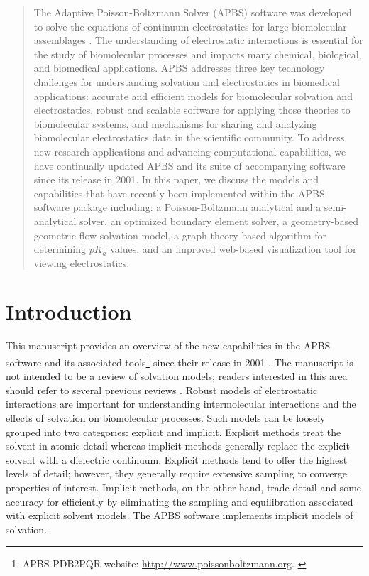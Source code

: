 \documentclass[11pt,titlepage]{article}
\begin{document}
\begin{abstract}
	The Adaptive Poisson-Boltzmann Solver (APBS) software was developed to solve the equations of continuum electrostatics for large biomolecular assemblages \cite{Baker2001b}.
	The understanding of electrostatic interactions is essential for the study of biomolecular processes and impacts many chemical, biological, and biomedical applications.
	APBS addresses three key technology challenges for understanding solvation and electrostatics in biomedical applications: accurate and efficient models for biomolecular solvation and electrostatics, robust and scalable software for applying those theories to biomolecular systems, and mechanisms for sharing and analyzing biomolecular electrostatics data in the scientific community.
	To address new research applications and advancing computational capabilities, we have continually updated APBS and its suite of accompanying software since its release in 2001.
	In this paper, we discuss the models and capabilities that have recently been implemented within the APBS software package including: a Poisson-Boltzmann analytical and a semi-analytical solver, an optimized boundary element solver, a geometry-based geometric flow solvation model, a graph theory based algorithm for determining $pK_a$ values, and an improved web-based visualization tool for viewing electrostatics.
\end{abstract}

\section{Introduction}
This manuscript provides an overview of the new capabilities in the APBS software and its associated tools\footnote{APBS-PDB2PQR website: \url{http://www.poissonboltzmann.org}. \label{foot:apbs}} since their release in 2001 \cite{Holst2000, Baker2000, Baker2001b, Baker2001}.
The manuscript is not intended to be a review of solvation models; readers interested in this area should refer to several previous reviews \cite{Davis1990, Perutz1978, Ren2012, Sharp1990, Roux1999, Warshel2006}.
Robust models of electrostatic interactions are important for understanding intermolecular interactions and the effects of solvation on biomolecular processes.
Such models can be loosely grouped into two categories:  explicit and implicit.
Explicit methods treat the solvent in atomic detail whereas implicit methods generally replace the explicit solvent with a dielectric continuum.
Explicit methods tend to offer the highest levels of detail; however, they generally require extensive sampling to converge properties of interest.
Implicit methods, on the other hand, trade detail and some accuracy for efficiently by eliminating the sampling and equilibration associated with explicit solvent models.
The APBS software implements implicit models of solvation.
\end{document}
